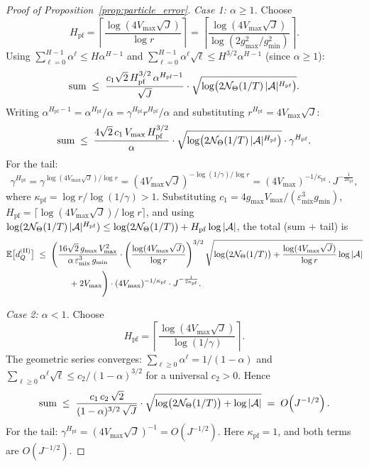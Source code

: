 \begin{proof}[Proof of Proposition~\ref{prop:particle_error}]
\emph{Case 1: $\alpha\ge 1$.} Choose
\[
H_{\mathrm{pf}}=\left\lceil\frac{\log(4V_{\max}\sqrt{J})}{\log r}\right\rceil
=\left\lceil\frac{\log(4V_{\max}\sqrt{J})}{\log(2g_{\max}^2/g_{\min}^2)}\right\rceil.
\]
Using $\sum_{\ell=0}^{H-1}\alpha^\ell\le H\alpha^{H-1}$ and $\sum_{\ell=0}^{H-1}\alpha^\ell\sqrt{\ell}\le H^{3/2}\alpha^{H-1}$ (since $\alpha\ge 1$):
\begin{equation}\label{eq:sum_alpha_ge1}
\text{sum}\;\le\;\frac{c_1\sqrt{2}\,H_{\mathrm{pf}}^{3/2}\,\alpha^{H_{\mathrm{pf}}-1}}{\sqrt{J}}\cdot\sqrt{\log\bigl(2{\mathcal{N}}_\Theta(1/T)\,|{\mathcal{A}}|^{H_{\mathrm{pf}}}\bigr)}.
\end{equation}
Writing $\alpha^{H_{\mathrm{pf}}-1}=\alpha^{H_{\mathrm{pf}}}/\alpha=\gamma^{H_{\mathrm{pf}}}r^{H_{\mathrm{pf}}}/\alpha$ and substituting $r^{H_{\mathrm{pf}}}=4V_{\max}\sqrt{J}$:
\begin{equation}\label{eq:sum_case1_final}
\text{sum}\;\le\;\frac{4\sqrt{2}\,c_1\,V_{\max}\,H_{\mathrm{pf}}^{3/2}}{\alpha}\cdot\sqrt{\log\bigl(2{\mathcal{N}}_\Theta(1/T)\,|{\mathcal{A}}|^{H_{\mathrm{pf}}}\bigr)}\cdot\gamma^{H_{\mathrm{pf}}}.
\end{equation}
For the tail:
\begin{equation}\label{eq:tail_case1}
\gamma^{H_{\mathrm{pf}}}=\gamma^{\log(4V_{\max}\sqrt{J})/\log r}=(4V_{\max}\sqrt{J})^{-\log(1/\gamma)/\log r}=(4V_{\max})^{-1/\kappa_{\mathrm{pf}}}\cdot J^{-\frac{1}{2\kappa_{\mathrm{pf}}}},
\end{equation}
where $\kappa_{\mathrm{pf}}=\log r/\log(1/\gamma)>1$. Substituting $c_1=4g_{\max}V_{\max}/(\varepsilon_{\mathrm{mix}}^3 g_{\min})$, $H_{\mathrm{pf}}=\lceil\log(4V_{\max}\sqrt{J})/\log r\rceil$, and using $\log(2{\mathcal{N}}_\Theta(1/T)\,|{\mathcal{A}}|^{H_{\mathrm{pf}}})\le\log(2{\mathcal{N}}_\Theta(1/T))+H_{\mathrm{pf}}\log|{\mathcal{A}}|$, the total (sum $+$ tail) is
\begin{align}
\mathbb{E}\bigl[d_Q^{\mathrm{(II)}}\bigr]
&\;\le\;
\Biggl(\frac{16\sqrt{2}\,g_{\max}\,V_{\max}^2}{\alpha\,\varepsilon_{\mathrm{mix}}^3\,g_{\min}}\cdot \left(\frac{\log(4V_{\max}\sqrt{J})}{\log r}\right)^{3/2}\sqrt{\log\bigl(2{\mathcal{N}}_\Theta(1/T)\bigr)+\frac{\log(4V_{\max}\sqrt{J})}{\log r}\log|{\mathcal{A}}|}\notag\\
&\qquad\qquad+2V_{\max}\Biggr)\cdot(4V_{\max})^{-1/\kappa_{\mathrm{pf}}}\cdot J^{-\frac{1}{2\kappa_{\mathrm{pf}}}}.\label{eq:case1_full}
\end{align}

\emph{Case 2: $\alpha<1$.} Choose
\[
H_{\mathrm{pf}}=\left\lceil\frac{\log(4V_{\max}\sqrt{J})}{\log(1/\gamma)}\right\rceil.
\]
The geometric series converges: $\sum_{\ell\ge 0}\alpha^\ell=1/(1-\alpha)$ and $\sum_{\ell\ge 0}\alpha^\ell\sqrt{\ell}\le c_2/(1-\alpha)^{3/2}$ for a universal $c_2>0$. Hence
\[
\text{sum}\;\le\;\frac{c_1\,c_2\,\sqrt{2}}{(1-\alpha)^{3/2}\,\sqrt{J}}\cdot\sqrt{\log\bigl(2{\mathcal{N}}_\Theta(1/T)\bigr)+\log|{\mathcal{A}}|}
\;=\;O\!\left(J^{-1/2}\right).
\]
For the tail: $\gamma^{H_{\mathrm{pf}}}=(4V_{\max}\sqrt{J})^{-1}=O(J^{-1/2})$. Here $\kappa_{\mathrm{pf}}=1$, and both terms are $O(J^{-1/2})$.


\end{proof}

